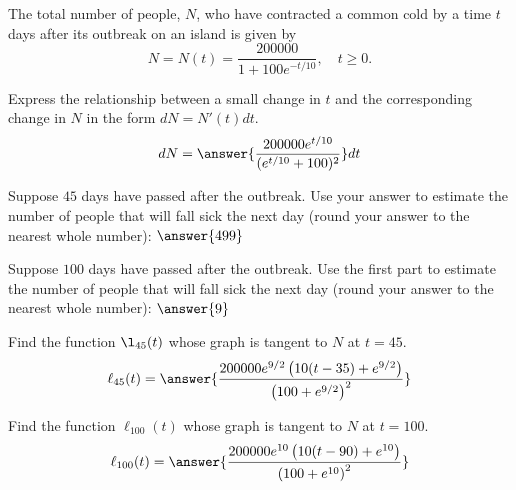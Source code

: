 \documentclass{ximera}
\begin{document}
The total number of people, $N$, who have contracted a common cold by a time $t$ days after its outbreak on an island is given by
\[
N=N(t)=\frac{200000}{1+100e^{-t/10}},\quad t\ge0.
\]
\begin{exercise}
Express the relationship between a small change in $t$ and the corresponding change in $N$ in the form $dN=N'(t)dt$.
\[
dN=\answer{\frac{200000 e^{t/10}}{(e^{t/10}+100)^2}}dt
\]
\begin{exercise}
Suppose $45$ days have passed after the outbreak. Use your answer to estimate the number of people that will fall sick the next day (round your answer to the nearest whole number): $\answer{499}$
\begin{exercise}
Suppose $100$ days have passed after the outbreak. Use the first part to estimate the number of people that will fall sick the next day (round your answer to the nearest whole number): $\answer{9}$
\begin{exercise}
Find the function $\l_{45}(t)$ whose graph is tangent to $N$ at $t=45$.
\[
\ell_{45}(t)=\answer{\frac{200000 e^{9/2} \left(10 (t-35)+e^{9/2}\right)}{\left(100+e^{9/2}\right)^2}}
\]
\begin{exercise}
Find the function $\ell_{100}(t)$ whose graph is tangent to $N$ at $t=100$.
\[
\ell_{100}(t)=\answer{\frac{200000 e^{10} \left(10 (t-90)+e^{10}\right)}{\left(100+e^{10}\right)^2}}
\]
\end{exercise}
\end{exercise}
\end{exercise}
\end{exercise}
\end{exercise}
\end{document}
